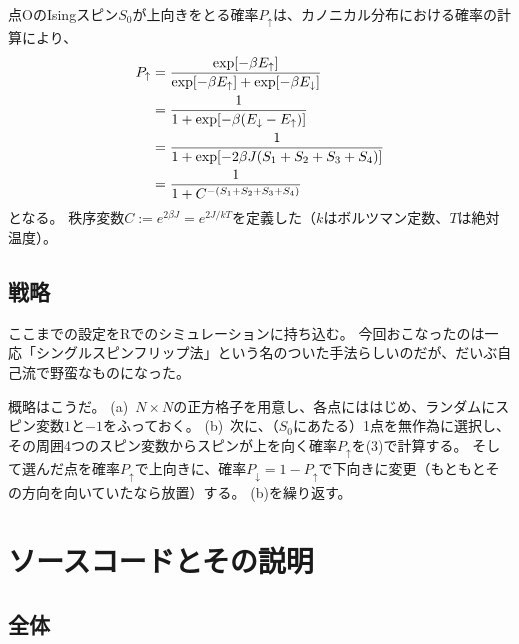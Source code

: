 \documentclass[fontsize = 12pt]{jlreq}
\begin{document}
点OのIsingスピン$S_0$が上向きをとる確率$P_\uparrow $は、カノニカル分布における確率の計算により、
\begin{align}
P_\uparrow &= \frac{\exp[-\beta E_\uparrow]}{\exp[-\beta E_\uparrow] + \exp[- \beta E_\downarrow] } \notag \\
&= \frac{1}{1 + \exp[-\beta (E_\downarrow - E_\uparrow)]} \notag \\
&= \frac{1}{1 + \exp[-2 \beta J (S_1 + S_2 + S_3 + S_4)]} \notag \\
&= \frac{1}{1 + C^{-(S_1 + S_2 + S_3 + S_4 )}} \label{eq:1.3}
\end{align}
となる。
秩序変数$C := e^{2 \beta J} = e^{2J/{kT}}$を定義した（$k$はボルツマン定数、$T$は絶対温度）。

\subsection{戦略} \label{s:1.2}

ここまでの設定をRでのシミュレーションに持ち込む。
今回おこなったのは一応「シングルスピンフリップ法」という名のついた手法らしいのだが、だいぶ自己流で野蛮なものになった。

概略はこうだ。
(a)~$N \times N$の正方格子を用意し、各点にははじめ、ランダムにスピン変数$1$と$-1$をふっておく。
(b)~次に、（$S_0$にあたる）1点を無作為に選択し、その周囲4つのスピン変数からスピンが上を向く確率$P_\uparrow$を(3)で計算する。
そして選んだ点を確率$P_\uparrow$で上向きに、確率$P_\downarrow = 1 - P_\uparrow$で下向きに変更（もともとその方向を向いていたなら放置）する。
(b)を繰り返す。

\section{ソースコードとその説明}

\subsection{全体}
\end{document}
